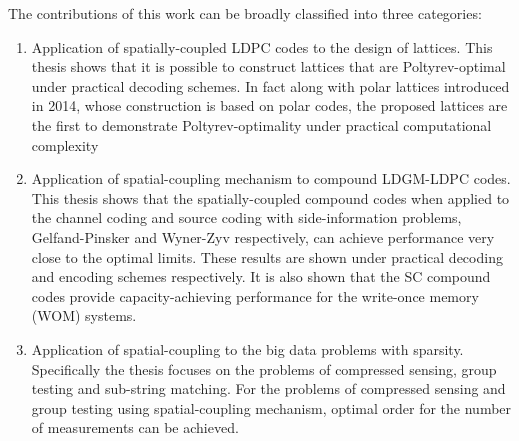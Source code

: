 The contributions of this work can be broadly classified into three categories: 
\begin{enumerate}
\item Application of spatially-coupled LDPC codes to the design of lattices. This thesis shows that it is possible to construct lattices that are Poltyrev-optimal under practical decoding schemes. In fact along with polar lattices introduced in 2014, whose construction is based on polar codes, the proposed lattices are the first to demonstrate Poltyrev-optimality under practical computational complexity

\item Application of spatial-coupling mechanism to compound LDGM-LDPC codes. This thesis shows that the spatially-coupled compound codes when applied to the channel coding and source coding with side-information problems, Gelfand-Pinsker and Wyner-Zyv respectively, can achieve performance very close to the optimal limits. These results  are shown under practical decoding and encoding schemes respectively. It is also shown that the SC compound codes provide capacity-achieving performance for the write-once memory (WOM) systems.

\item Application of spatial-coupling to the big data problems with sparsity. Specifically the thesis focuses on the problems of compressed sensing, group testing and sub-string matching. For the problems of compressed sensing and group testing using spatial-coupling mechanism, optimal order for the number of measurements can be achieved. 
\end{enumerate}  
\pagebreak{}
